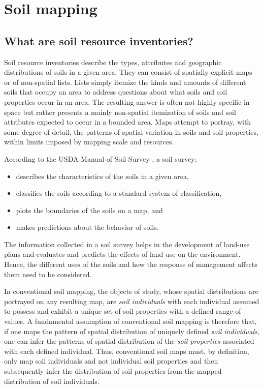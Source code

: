 \documentclass[graybox,natbib,nospthms,UStrade]{svmono}
\begin{document}
\hypertarget{soil-mapping}{%
\section{Soil mapping}\label{soil-mapping}}

\hypertarget{what-are-soil-resource-inventories}{%
\subsection{What are soil resource inventories?}\label{what-are-soil-resource-inventories}}

Soil resource inventories describe the types, attributes and geographic
distributions of soils in a given area. They can consist of spatially
explicit maps or of non-spatial lists. Lists simply itemize the kinds
and amounts of different soils that occupy an area to address questions
about what soils and soil properties occur in an area. The resulting
answer is often not highly specific in space but rather presents a
mainly non-spatial itemization of soils and soil attributes expected to
occur in a bounded area. Maps attempt to portray, with some degree of
detail, the patterns of spatial variation in soils and soil properties,
within limits imposed by mapping scale and resources.

According to the USDA Manual of Soil Survey \citep{SSDS1993}, a soil survey:

\begin{itemize}
\item
  describes the characteristics of the soils in a given area,
\item
  classifies the soils according to a standard system of
  classification,
\item
  plots the boundaries of the soils on a map, and
\item
  makes predictions about the behavior of soils.
\end{itemize}

The information collected in a soil survey helps in the development of
land-use plans and evaluates and predicts the effects of land use on the
environment. Hence, the different uses of the soils and how the response
of management affects them need to be considered.

In conventional soil mapping, the objects of study, whose spatial
distributions are portrayed on any resulting map, are \emph{soil individuals}
with each individual assumed to possess and exhibit a unique set of soil properties
with a defined range of values. A fundamental assumption of conventional
soil mapping is therefore that, if one maps the pattern of spatial
distribution of uniquely defined \emph{soil individuals}, one can infer the
patterns of spatial distribution of the \emph{soil properties} associated
with each defined individual. Thus, conventional soil maps must, by
definition, only map soil individuals and not individual soil properties
\citep{SSDS1993} and then subsequently infer the distribution of soil
properties from the mapped distribution of soil individuals.
\end{document}
